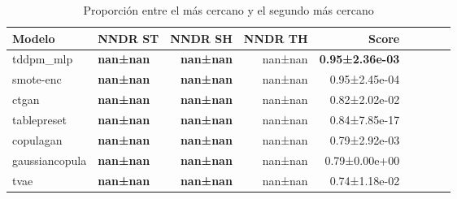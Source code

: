 \begin{table}[H]
\centering
\fontsize{10}{14}\selectfont
\caption{Proporción entre el más cercano y el segundo más cercano}
\label{table-dcr-king county-a}
\begin{tabular}{|l|l|r|r|r|r|r|r|r|}
\hline
\rowcolor[gray]{0.8}
Modelo & NNDR ST & NNDR SH & NNDR TH & \textbf{Score} \\
\hline tddpm\_mlp & \bfseries \cellcolor[rgb]{0.9, 0.54, 0.52} nan±nan & \bfseries \cellcolor[rgb]{0.9, 0.54, 0.52} nan±nan & nan±nan & \bfseries 0.95±2.36e-03 \\
\hline smote-enc & \bfseries \cellcolor[rgb]{0.9, 0.54, 0.52} nan±nan & \bfseries \cellcolor[rgb]{0.9, 0.54, 0.52} nan±nan & nan±nan & 0.95±2.45e-04 \\
\hline ctgan & \bfseries \cellcolor[rgb]{0.9, 0.54, 0.52} nan±nan & \bfseries \cellcolor[rgb]{0.9, 0.54, 0.52} nan±nan & nan±nan & 0.82±2.02e-02 \\
\hline tablepreset & \bfseries \cellcolor[rgb]{0.9, 0.54, 0.52} nan±nan & \bfseries \cellcolor[rgb]{0.9, 0.54, 0.52} nan±nan & nan±nan & 0.84±7.85e-17 \\
\hline copulagan & \bfseries \cellcolor[rgb]{0.9, 0.54, 0.52} nan±nan & \bfseries \cellcolor[rgb]{0.9, 0.54, 0.52} nan±nan & nan±nan & 0.79±2.92e-03 \\
\hline gaussiancopula & \bfseries \cellcolor[rgb]{0.9, 0.54, 0.52} nan±nan & \bfseries \cellcolor[rgb]{0.9, 0.54, 0.52} nan±nan & nan±nan & 0.79±0.00e+00 \\
\hline tvae & \bfseries \cellcolor[rgb]{0.9, 0.54, 0.52} nan±nan & \bfseries \cellcolor[rgb]{0.9, 0.54, 0.52} nan±nan & nan±nan & \cellcolor[rgb]{0.9, 0.54, 0.52} 0.74±1.18e-02 \\
\hline
\end{tabular}
\end{table}

